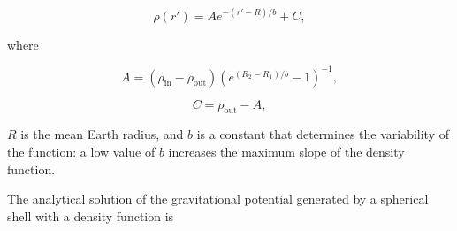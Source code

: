 \documentclass[extra]{gji}
\begin{document}
\begin{equation}
    \rho(r') = A e^{-(r' - R)/b} + C,
\end{equation}

\noindent where

\begin{equation}
    A = (\rho_\text{in} - \rho_\text{out})
        \left( e^{( R_2 - R_1 )/b} - 1 \right)^{-1},
\end{equation}

\begin{equation}
    C = \rho_\text{out} - A,
\end{equation}

\noindent $R$ is the mean Earth radius, and $b$ is a constant
that determines the variability of the function: a low value of $b$
increases the maximum slope of the density function.

The analytical solution of the gravitational potential generated by a
spherical shell with a density function is

\end{document}
